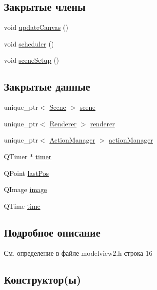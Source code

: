 \subsection*{Закрытые члены}
\begin{DoxyCompactItemize}
\item 
void \hyperlink{class_model_view2_acff1b190997243a07c654af83e7dd4e0}{update\+Canvas} ()
\item 
void \hyperlink{class_model_view2_a5ac909e07ab7908e7c9b6e63d92666af}{scheduler} ()
\item 
void \hyperlink{class_model_view2_a27eb4e398dc6506c3896175335d15850}{scene\+Setup} ()
\end{DoxyCompactItemize}
\subsection*{Закрытые данные}
\begin{DoxyCompactItemize}
\item 
unique\+\_\+ptr$<$ \hyperlink{class_scene}{Scene} $>$ \hyperlink{class_model_view2_acb280540a8957a2f7a50ebf689608831}{scene}
\item 
unique\+\_\+ptr$<$ \hyperlink{class_renderer}{Renderer} $>$ \hyperlink{class_model_view2_ab6f007ccf983cf121c11717f90bfe7a8}{renderer}
\item 
unique\+\_\+ptr$<$ \hyperlink{class_action_manager}{Action\+Manager} $>$ \hyperlink{class_model_view2_ad4ef1f165c0f1341dd73b7a8c0be357e}{action\+Manager}
\item 
Q\+Timer $\ast$ \hyperlink{class_model_view2_ab6f5ba3f864092610433f644bdd09540}{timer}
\item 
Q\+Point \hyperlink{class_model_view2_a2ab7665cf858a630e0c08accf1cad25b}{last\+Pos}
\item 
Q\+Image \hyperlink{class_model_view2_acfbdec1f9d732929c211bd7f7fe60132}{image}
\item 
Q\+Time \hyperlink{class_model_view2_a74993d9390f59b659289765f886e3bfd}{time}
\end{DoxyCompactItemize}


\subsection{Подробное описание}


См. определение в файле modelview2.\+h строка 16



\subsection{Конструктор(ы)}
